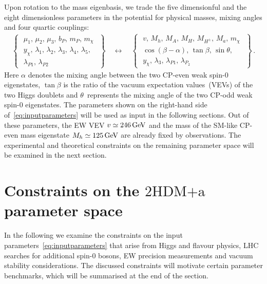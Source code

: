 \documentclass[a4paper, 11pt,notoc]{article}
\newcommand{\hdma}{\ensuremath{\textrm{2HDM+a}}\xspace}
\begin{document}
Upon rotation to the mass eigenbasis, we trade the five dimensionful and the eight dimensionless parameters in the potential for physical masses, mixing angles and four quartic couplings:
\begin{align} \label{eq:inputparameters}
\left\{ \,\,\begin{matrix}
\mu_1,\,\mu_2,\,\mu_3,\,b_P,\,m_P,\,m_\chi\\[3pt]
y_\chi,\,\lambda_1,\,\lambda_2,\,\lambda_3,\,\lambda_4,\,\lambda_5,\\
\lambda_{P1},\,\lambda_{P2}
\end{matrix}\,\,\right\}\quad  \longleftrightarrow  \quad \left\{ \,\,\begin{matrix}
v,\,M_h,\,M_A,\,M_H,\,M_{H^\pm},\,M_a,\,m_\chi \\[3pt]
\cos(\beta-\alpha),\,\tan \beta,\,\sin  \theta,\\[3pt]
y_\chi,\,\lambda_3,\,\lambda_{P1},\,\lambda_{P_2}
\end{matrix}\,\,\right\}\,.
\end{align}
Here $\alpha$ denotes the mixing angle between the two CP-even weak spin-0 eigenstates, $\tan \beta$ is the ratio of the vacuum expectation values~(VEVs) of the two Higgs doublets and $\theta$~represents the mixing angle of the two CP-odd weak spin-0 eigenstates. The parameters shown on the right-hand side of~\eqref{eq:inputparameters} will be used as input in the following sections. Out of these  parameters, the EW VEV $v \simeq 246 \, {\rm GeV}$ and the mass of the SM-like CP-even mass eigenstate $M_h \simeq 125 \, {\rm GeV}$ are already fixed by observations. The experimental and theoretical constraints on the remaining parameter space will be examined in the next section. 


\section{Constraints on the \hdma parameter space}
\label{sec:constraints}

In the following we examine the constraints on the input parameters~\eqref{eq:inputparameters} that arise from Higgs and flavour physics, LHC searches for additional spin-0 bosons, EW precision measurements and vacuum stability considerations. The discussed constraints will motivate certain parameter benchmarks, which will be summarised at the end of the section. 
\end{document}
